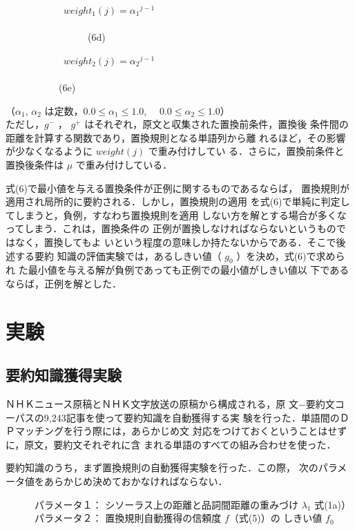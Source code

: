  \ \ \ \ \ \ \ \ \ \ \ \
$weight_1(j) = { \alpha _1 }^{j-1}$
 \ \ \ \ \ \ \ \ \ \ \ \ \ \ \ \ \ \ \ \ \ \ \ \ \ \ \ \ \ \ \ \ \ \ \ \ \ \ \ \ \ \ 
 \ \ \ \ \ \ \ \ \ \ \ \ \ \ \ \ \ \ \ \ \ \ \ \ \ \ \ \ \ \ \ \ \ \ \ \ \ \ \ \ \ \ \ \ \ \ \ 
(6d)

 \ \ \ \ \ \ \ \ \ \ \ \
$weight_2(j) = { \alpha _2 }^{j-1}$
 \ \ \ \ \ \ \ \ \ \ \ \ \ \ \ \ \ \ \ \ \ \ \ \ \ \ \ \ \ \ \ \ \ \ \ \ \ \ \ 
 \ \ \ \ \ \ \ \ \ \ \ \ \ \ \ \ \ \ \ \ \ \ \ \ \ \ \ \ \ \ \ \ \ \ \ \ \ \ \ \ \ \ \ \ 
(6e)

（$\alpha _1$, $\alpha _2$ は定数，$0.0 \le \alpha _1 \le 1.0$, \ \ $0.0 \le \alpha _2 \le 1.0$）
\vspace{10mm}\\
ただし，$g^-$ ， $g^+$ はそれぞれ，原文と収集された置換前条件，置換後
条件間の距離を計算する関数であり，置換規則となる単語列から離
れるほど，その影響が少なくなるように $weight(j)$ で重み付けしてい
る．さらに，置換前条件と置換後条件は $\mu $ で重み付けしている．

式(6)で最小値を与える置換条件が正例に関するものであるならば，
置換規則が適用され局所的に要約される．しかし，置換規則の適用
を式(6)で単純に判定してしまうと，負例，すなわち置換規則を適用
しない方を解とする場合が多くなってしまう．これは，置換条件の
正例が置換しなければならないというものではなく，置換してもよ
いという程度の意味しか持たないからである．そこで後述する要約
知識の評価実験では，あるしきい値（ $g_0$ ）を決め，式(6)で求められ
た最小値を与える解が負例であっても正例での最小値がしきい値以
下であるならば，正例を解とした．

\section{実験}
\label{sec:sec5}
\subsection{要約知識獲得実験}
\label{sec:sec5-1}
ＮＨＫニュース原稿とＮＨＫ文字放送の原稿から構成される，原
文−要約文コーパスの9,243記事を使って要約知識を自動獲得する実
験を行った．単語間のＤＰマッチングを行う際には，あらかじめ文
対応をつけておくということはせずに，原文，要約文それぞれに含
まれる単語のすべての組み合わせを使った．

要約知識のうち，まず置換規則の自動獲得実験を行った．この際，
次のパラメータ値をあらかじめ決めておかなければならない．

\begin{flushleft}
　　　{\gt パラメータ１：} シソーラス上の距離と品詞間距離の重みづけ $\lambda _1$ 
式(1a)） \\
　　　{\gt パラメータ２：} 置換規則自動獲得の信頼度 $f$（式(5)）の
しきい値 $f_0$ 
\end{flushleft}

